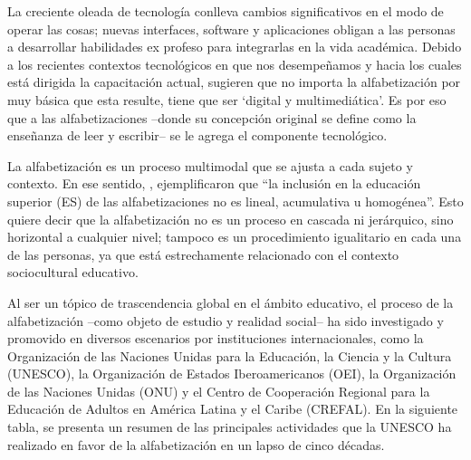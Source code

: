 \documentclass[spanish]{textolivre}
\begin{document}
La creciente oleada de tecnología conlleva cambios significativos en el modo de operar las cosas; nuevas interfaces, software y aplicaciones obligan a las personas a desarrollar habilidades ex profeso para integrarlas en la vida académica. Debido a los recientes contextos tecnológicos en que nos desempeñamos y hacia los cuales está dirigida la capacitación actual, \textcite{avello__martinez_evolucion_2015} sugieren que no importa la alfabetización por muy básica que esta resulte, tiene que ser ‘digital y multimediática’. Es por eso que a las alfabetizaciones –donde su concepción original se define como la enseñanza de leer y escribir– se le agrega el componente tecnológico. 

La alfabetización es un proceso multimodal que se ajusta a cada sujeto y contexto. En ese sentido, \textcite[p. 151]{ruiz_requies_formar_2010}, ejemplificaron que “la inclusión en la educación superior (ES) de las alfabetizaciones no es lineal, acumulativa u homogénea”. Esto quiere decir que la alfabetización no es un proceso en cascada ni jerárquico, sino horizontal a cualquier nivel; tampoco es un procedimiento igualitario en cada una de las personas, ya que está estrechamente relacionado con el contexto sociocultural educativo. 

Al ser un tópico de trascendencia global en el ámbito educativo, el proceso de la alfabetización –como objeto de estudio y realidad social– ha sido investigado y promovido en diversos escenarios por instituciones internacionales, como la Organización de las Naciones Unidas para la Educación, la Ciencia y la Cultura (UNESCO), la Organización de Estados Iberoamericanos (OEI), la Organización de las Naciones Unidas (ONU) y el Centro de Cooperación Regional para la Educación de Adultos en América Latina y el Caribe (CREFAL). En la siguiente tabla, se presenta un resumen de las principales actividades que la UNESCO ha realizado en favor de la alfabetización en un lapso de cinco décadas.
\end{document}
